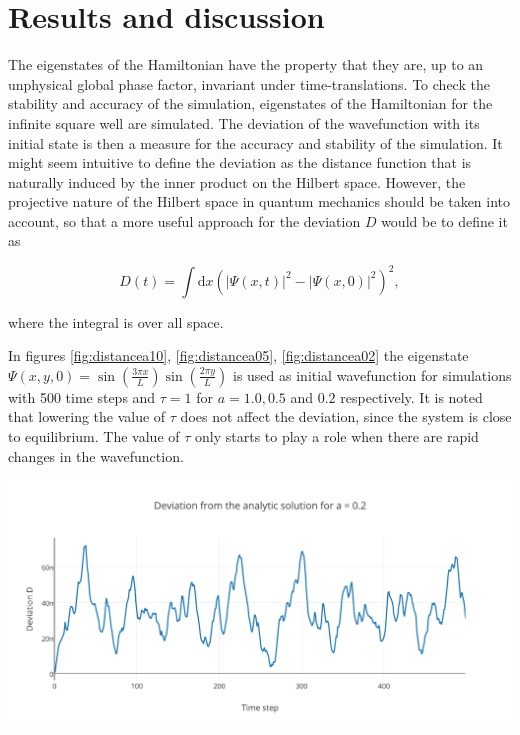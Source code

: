 
\section{Results and discussion}
The eigenstates of the Hamiltonian have the property that they are, up to an unphysical global phase factor, invariant under time-translations. To check the stability and accuracy of the simulation, eigenstates of the Hamiltonian for the infinite square well are simulated. The deviation of the wavefunction with its initial state is then a measure for the accuracy and stability of the simulation. It might seem intuitive to define the deviation as the distance function that is naturally induced by the inner product on the Hilbert space. However, the projective nature of the Hilbert space in quantum mechanics should be taken into account, so that a more useful approach for the deviation $D$ would be to define it as

\[
D(t) = \int\mathrm{d}x\left(|\Psi(x,t)|^2-|\Psi(x,0)|^2\right)^2,
\]

where the integral is over all space. 

In figures \ref{fig:distancea10}, \ref{fig:distancea05}, \ref{fig:distancea02} the eigenstate $\Psi(x,y,0) = \sin(\frac{3 \pi x}{L})\sin(\frac{2 \pi y}{L})$ is used as initial wavefunction for simulations with 500 time steps and $\tau = 1$ for $a = 1.0, 0.5$ and $0.2$ respectively. It is noted that lowering the value of $\tau$ does not affect the deviation, since the system is close to equilibrium. The value of $\tau$ only starts to play a role when there are rapid changes in the wavefunction.

\begin{Figure}
    \centering
    \includegraphics[width=\linewidth]{distancea10.pdf}
    \label{fig:distancea10}
\end{Figure}


